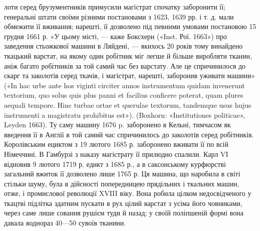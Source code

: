 лоти серед брузументників примусили магістрат спочатку заборонити її;
генеральні штати своїми різними постановами з 1623, 1639 рр. і т. д.
мали обмежити її вживання; нарешті, її дозволено під певними умовами
постановою 15 грудня 1661 р. «У цьому місті, — каже Боксхерн («Inst.
Рої. 1663») про заведення стьожкової машини в Ляйдені, — якихось 20 років
тому винайдено ткацький варстат, на якому один робітник міг легше й
більше виробляти тканин, аніж багато робітників за той самий час без
варстату. Але це спричинилося до скарг та заколотів серед ткачів, і магістрат,
нарешті, заборонив уживати машини» («In hac urbe ante hos viginti
circiter annos instrumentum quidam invenerunt textorium, quo solus quis
plus panni et facilius conficere poterat, quam plures aequali tempore. Hinc
turbae ortae et querulae textorum, tandemque usus hujus instrumenti a
magistratu prohibitus est»). (Boxhorn: «Institutiones politicae», Leyden
1663). Ту саму машину 1676 p. заборонено в Кельні, тимчасом як введення
її в Англії в той самий час спричинилось до заколотів серед робітників.
Королівським ециктом з 19 лютого 1685 р. заборонено вживати її по всій
Німеччині. В Гамбурзі з наказу магістрату її прилюдно спалили. Карл VI
відновив 9 лютого 1719 р. едикт з 1685 р., а в саксонському курфюрстві
загальний вжиток її дозволено лише 1765 р. Ця машина, що наробила в
світі стільки шуму, була в дійсності попередницею прядільних і ткальних
машин, отже, і промислової революції XVIII віку. Вона робила цілком
недосвідченого у ткацтві підлітка здатним пускати в рух цілий
варстат з усіма його човниками, через саме лише совання рушієм туди
й назад; у своїй поліпшеній формі вона давала воднораз 40—50 сувоїв
тканини.